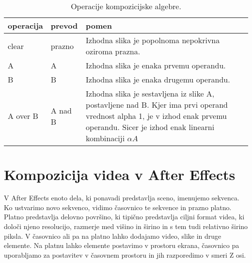 \documentclass[a4paper, 12pt]{book}
\begin{document}
\begin{table}
\begin{center}
\begin{tabular}{p{} | p{} | p{} }
\hline
{\bf operacija} & {\bf prevod } & {\bf pomen} \\ \hline
clear & prazno & Izhodna slika je popolnoma nepokrivna oziroma prazna. \\ \hline
A & A & Izhodna slika je enaka prvemu operandu. \\
B & B & Izhodna slika je enaka drugemu operandu. \\ \hline
A over B & A nad B & Izhodna slika je sestavljena iz slike A, postavljene nad B. Kjer ima prvi operand vrednost alpha 1, je v izhod enak prvemu operandu. 
Sicer je izhod enak linearni kombinaciji $\alpha A  $  \\
\end{tabular}
\end{center}
\caption{Operacije kompozicijske algebre.}
\label{tbl:kompOperacije}
\end{table}




\section{Kompozicija videa v After Effects}

V After Effects enoto dela, ki ponavadi predstavlja sceno, imenujemo sekvenca\cite{aeclassroom}.
Ko ustvarimo novo sekvenco, vidimo časovnico te sekvence in prazno platno.
Platno predstavlja delovno površino, ki tipično predstavlja ciljni format videa, ki določi njeno resolucijo, razmerje med višino in širino in s tem tudi relativno širino piksla.
V časovnico ali pa na platno lahko dodajamo video, slike in druge elemente.
Na platnu lahko elemente postavimo v prostoru ekrana,
časovnico pa uporabljamo za postavitev v časovnem prostoru in jih razporedimo v smeri Z osi.
\end{document}
